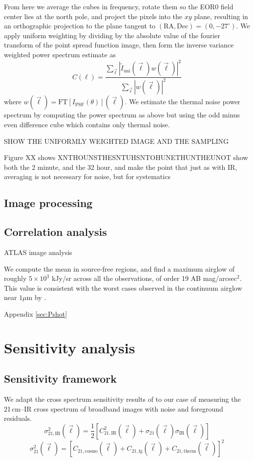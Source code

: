 \documentclass{emulateapj}
\newcommand{\IR}{\text{IR}}
\newcommand{\therm}{\text{therm}}
\newcommand{\cosmo}{\text{cosmo}}
\newcommand{\fg}{\text{fg}}
\begin{document}
From here we average the cubes in frequency, rotate them so the EOR0 field center lies at the north pole, and project the pixels into the $xy$ plane, resulting in an orthographic projection to the plane tangent to  $(\text{RA}, \text{Dec})=(0,-27^\circ)$. We apply uniform weighting by dividing by the absolute value of the fourier transform of the point spread function image, then form the inverse variance weighted power spectrum estimate as
\begin{equation}
	C(\ell)=\frac{\sum_{\vec{\ell}}|\tilde{I}_\text{uni}(\vec{\ell})w(\vec{\ell})|^2}{\sum_{\vec{\ell}}|w(\vec{\ell})|^2}
\end{equation}
where $w(\vec{\ell})=\text{FT}[I_\text{PSF}(\theta)](\vec{\ell})$. We estimate the thermal noise power spectrum by computing the power spectrum as above but using the odd minus even difference cube which contains only thermal noise.

SHOW THE UNIFORMLY WEIGHTED IMAGE AND THE SAMPLING

Figure XX shows XNTHOUNSTHESNTUHSNTOHUNETHUNTHEUNOT
	show both the 2 minute, and the 32 hour, and make the point that just as with IR, averaging is not necessary for noise, but for systematics


\subsection{Image processing}

\subsection{Correlation analysis}

ATLAS image analysis



We compute the mean in source-free regions, and find a maximum airglow of roughly $5\times10^3$ kJy/sr across all the observations, of order 19 AB mag/arcsec$^2$. This value is consistent with the worst cases observed in the continuum airglow near $1\mu$m by \citet{sullivan12}.

Appendix \ref{sec:Pshot}


\section{Sensitivity analysis}

\subsection{Sensitivity framework}
We adapt the cross spectrum sensitivity results of \citet{lidz09} to our case of measuring the 21\,cm--IR cross spectrum of broadband images with noise and foreground residuals. 
\begin{equation}
\label{eqn:sense1}
	\sigma_{21,\IR}^2(\vec{\ell})=\frac{1}{2}[C^2_{21,\IR}(\vec{\ell})+\sigma_{21}(\vec{\ell})\sigma_{\IR}(\vec{\ell})]
\end{equation}
\begin{equation}
\label{eqn:sense2}
	\sigma_{21}^2(\vec{\ell})=[C_{21,\cosmo}(\vec{\ell})+C_{21,\fg}(\vec{\ell})+C_{21,\therm}(\vec{\ell})]^2
\end{equation}
\end{document}
